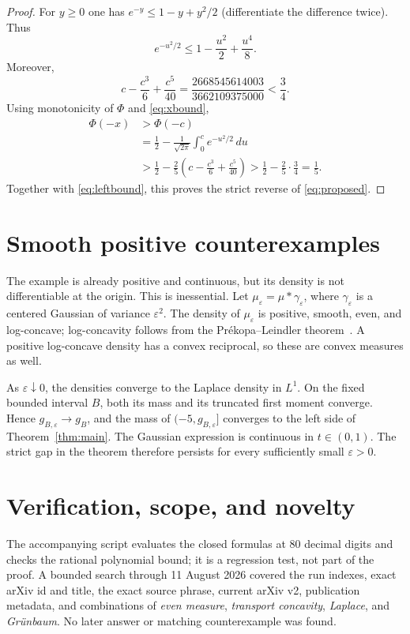 \documentclass[11pt,a4paper]{article}
\newcommand{\PhiG}{\Phi}
\begin{document}
\begin{proof}
For $y\ge0$ one has $e^{-y}\le1-y+y^2/2$ (differentiate the
difference twice).  Thus
\[
 e^{-u^2/2}\le1-\frac{u^2}{2}+\frac{u^4}{8}.
\]
Moreover,
\[
 c-\frac{c^3}{6}+\frac{c^5}{40}
 =\frac{2668545614003}{3662109375000}<\frac34.
\]
Using monotonicity of $\PhiG$ and \eqref{eq:xbound},
\begin{align*}
 \PhiG(-x)&>\PhiG(-c)\\
 &=\frac12-\frac1{\sqrt{2\pi}}
     \int_0^c e^{-u^2/2}\,du\\
 &>\frac12-\frac25
   \left(c-\frac{c^3}{6}+\frac{c^5}{40}\right)
 >\frac12-\frac25\cdot\frac34=\frac15.
\end{align*}
Together with \eqref{eq:leftbound}, this proves the strict reverse of
\eqref{eq:proposed}.
\end{proof}

\section{Smooth positive counterexamples}

The example is already positive and continuous, but its density is not
differentiable at the origin.  This is inessential.  Let
$\mu_\varepsilon=\mu*\gamma_\varepsilon$, where
$\gamma_\varepsilon$ is a centered Gaussian of variance $\varepsilon^2$.
The density of $\mu_\varepsilon$ is positive, smooth, even, and log-concave;
log-concavity follows from the Pr\'ekopa--Leindler theorem~\cite{Prekopa}.
A positive log-concave density has a convex reciprocal, so these are convex
measures as well.

As $\varepsilon\downarrow0$, the densities converge to the Laplace density
in $L^1$.  On the fixed bounded interval $B$, both its mass and its truncated
first moment converge.  Hence $g_{B,\varepsilon}\to g_B$, and the mass of
$(-5,g_{B,\varepsilon}]$ converges to the left side of Theorem~\ref{thm:main}.
The Gaussian expression is continuous in $t\in(0,1)$.  The strict gap in the
theorem therefore persists for every sufficiently small $\varepsilon>0$.

\section{Verification, scope, and novelty}

The accompanying script evaluates the closed formulas at 80 decimal digits
and checks the rational polynomial bound; it is a regression test, not part
of the proof.  A bounded search through 11 August 2026 covered the run
indexes, exact arXiv id and title, the exact source phrase, current arXiv v2,
publication metadata, and combinations of \emph{even measure},
\emph{transport concavity}, \emph{Laplace}, and \emph{Gr\"unbaum}.  No later
answer or matching counterexample was found.
\end{document}
